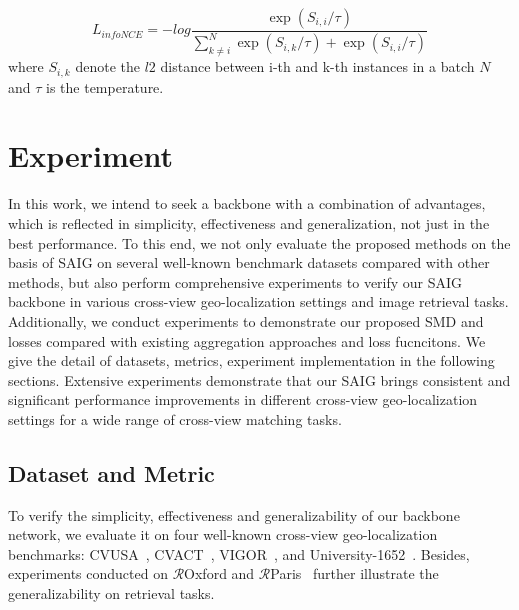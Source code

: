 \documentclass[sn-basic,iicol]{sn-jnl}
\theoremstyle{thmstyletwo}\newtheorem{example}{Example}\newtheorem{remark}{Remark}
\theoremstyle{thmstylethree}\newtheorem{definition}{Definition}
\begin{document}
 \begin{equation}
 L_{infoNCE} = -log\frac{\exp(S_{i,i}/\tau)}{\sum^N_{k\neq i} \exp(S_{i,k}/\tau) + \exp(S_{i,i}/\tau)} \label{infoNCEloss}
 \end{equation}
where $S_{i,k}$ denote the $l2$ distance between i-th and k-th instances in a batch $N$ and $\tau$ is the temperature. 
 
 

\section{Experiment}\label{sec4}

In this work, we intend to seek a backbone with a combination of advantages, which is reflected in simplicity, effectiveness and generalization, not just in the best performance. To this end, we not only evaluate the proposed methods on the basis of SAIG on several well-known benchmark datasets compared with other methods, but also perform comprehensive experiments to verify our SAIG backbone in various cross-view geo-localization settings and image retrieval tasks. Additionally, we conduct experiments to demonstrate our proposed SMD and losses compared with existing aggregation approaches and loss fucncitons.
We give the detail of datasets, metrics, experiment implementation in the following sections. Extensive experiments demonstrate that our SAIG brings consistent and significant performance improvements in different cross-view geo-localization settings for a wide range of cross-view matching tasks.



\subsection{Dataset and Metric}

To verify the simplicity, effectiveness and generalizability of our backbone network, we evaluate it on four well-known cross-view geo-localization benchmarks: CVUSA~\citep{CVUSA}, CVACT~\citep{liu2019lending}, VIGOR~\citep{VIGOR2021}, and University-1652~\citep{2020University-1652}. Besides, experiments conducted on $\mathcal{R}$Oxford and $\mathcal{R}$Paris~\citep{RoxfordAndParis} further illustrate the generalizability on retrieval tasks.  
\end{document}

